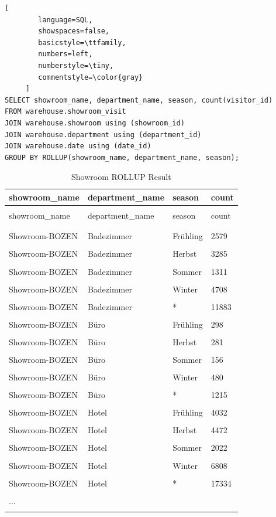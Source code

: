\documentclass[letterpaper,12pt]{article}
\begin{document}
\begin{lstlisting}[
        language=SQL,
        showspaces=false,
        basicstyle=\ttfamily,
        numbers=left,
        numberstyle=\tiny,
        commentstyle=\color{gray}
     ]
SELECT showroom_name, department_name, season, count(visitor_id)
FROM warehouse.showroom_visit
JOIN warehouse.showroom using (showroom_id)
JOIN warehouse.department using (department_id)
JOIN warehouse.date using (date_id)
GROUP BY ROLLUP(showroom_name, department_name, season);
\end{lstlisting}


\begingroup
\renewcommand\arraystretch{0.5}
\begin{longtable}{p{4cm}p{4cm}p{4cm}p{4cm}}
        \caption{Showroom ROLLUP Result} \\
				showroom\_name & department\_name & season & count \\
        \endfirsthead \\
        showroom\_name & department\_name & season & count \\
        \endhead \\
        \hline \\
				Showroom-BOZEN & Badezimmer & Frühling & 2579 \\
\hline \\
Showroom-BOZEN & Badezimmer & Herbst & 3285 \\
\hline \\
Showroom-BOZEN & Badezimmer & Sommer & 1311 \\
\hline \\
Showroom-BOZEN & Badezimmer & Winter & 4708 \\
\hline \\
Showroom-BOZEN & Badezimmer & * & 11883 \\
\hline \\
Showroom-BOZEN & Büro & Frühling & 298 \\
\hline \\
Showroom-BOZEN & Büro & Herbst & 281 \\
\hline \\
Showroom-BOZEN & Büro & Sommer & 156 \\
\hline \\
Showroom-BOZEN & Büro & Winter & 480 \\
\hline \\
Showroom-BOZEN & Büro & * & 1215 \\
\hline \\
Showroom-BOZEN & Hotel & Frühling & 4032 \\
\hline \\
Showroom-BOZEN & Hotel & Herbst & 4472 \\
\hline \\
Showroom-BOZEN & Hotel & Sommer & 2022 \\
\hline \\
Showroom-BOZEN & Hotel & Winter & 6808 \\
\hline \\
Showroom-BOZEN & Hotel & * & 17334 \\
\hline \\
... \\
\hline \\
\end{longtable} 
\endgroup
\end{document}
